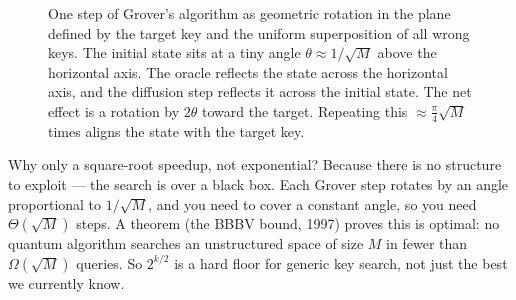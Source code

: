 \begin{figure}[H]
\centering
{}
\caption{One step of Grover's algorithm as geometric rotation in the plane defined by the target key and the uniform superposition of all wrong keys. The initial state sits at a tiny angle $\theta \approx 1/\sqrt{M}$ above the horizontal axis. The oracle reflects the state across the horizontal axis, and the diffusion step reflects it across the initial state. The net effect is a rotation by $2\theta$ toward the target. Repeating this $\approx \frac{\pi}{4}\sqrt{M}$ times aligns the state with the target key.}
\label{ch35:fig-grover-rotation}
\end{figure}

\begin{whybox}
Why only a square-root speedup, not exponential? Because there is no structure to exploit --- the search is over a black box. Each Grover step rotates by an angle proportional to $1/\sqrt M$, and you need to cover a constant angle, so you need $\Theta(\sqrt M)$ steps. A theorem (the BBBV bound, 1997) proves this is optimal: no quantum algorithm searches an unstructured space of size $M$ in fewer than $\Omega(\sqrt M)$ queries. So $2^{k/2}$ is a hard floor for generic key search, not just the best we currently know.
\end{whybox}

